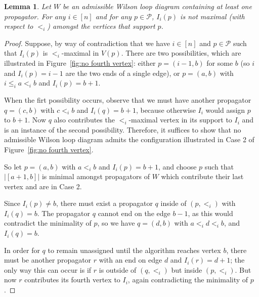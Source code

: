 \documentclass[11pt]{article}
\newcommand{\cP}{\mathcal{P}}
\newtheorem{lem}[thm]{Lemma}
\theoremstyle{remark}
\theoremstyle{definition}
\begin{document}
\begin{lem}\label{lem no fourth vertex}
Let $W$ be an admissible Wilson loop diagram containing at least one propagator. For any $i \in [n]$ and for any $p \in \cP$, $I_i(p)$ is not maximal (with respect to $<_i$) amongst the vertices that support $p$.
\end{lem} 
\begin{proof}
Suppose, by way of contradiction that we have $i \in [n]$ and $p \in \cP$ such that $I_i(p)$ is $<_i$-maximal in $V(p)$. There are two possibilities, which are illustrated in Figure~\ref{fig:no fourth vertex}: either $p = (i-1,b)$ for some $b$ (so $i$ and $I_i(p) = i-1$ are the two ends of a single edge), or $p = (a,b)$ with $i\leq_i a <_i b$ and $I_i(p) = b+1$. 

When the firt possibility occurs, observe that we must have another propagator $q = (c,b)$ with $c<_i b$ and $I_i(q) = b+1$, because otherwise $I_i$ would assign $p$ to $b+1$. Now $q$ also contributes the $<_i$-maximal vertex in its support to $I_i$ and is an instance of the second possibility. Therefore, it suffices to show that no admissible Wilson loop diagram admits the configuration illustrated in Case 2 of Figure~\ref{fig:no fourth vertex}. 

So let $p = (a,b)$ with $a<_ib$ and $I_i(p) = b+1$, and choose $p$ such that $\big|[a+1,b]\big|$ is minimal amongst propagators of $W$ which contribute their last vertex and are in Case 2.

Since $I_i(p) \neq b$, there must exist a propagator $q$ inside of $(p,<_i)$ with $I_i(q) = b$. The propagator $q$ cannot end on the edge $b-1$, as this would contradict the minimality of $p$, so we have $q = (d,b)$ with $a <_i d <_i b$, and $I_i(q) = b$. 

In order for $q$ to remain unassigned until the algorithm reaches vertex $b$, there must be another propagator $r$ with an end on edge $d$ and $I_i(r) = d+1$; the only way this can occur is if $r$ is outside of $(q,<_i)$ but inside $(p,<_i)$. But now $r$ contributes its fourth vertex to $I_i$, again contradicting the minimality of $p$.
\end{proof}
\end{document}
